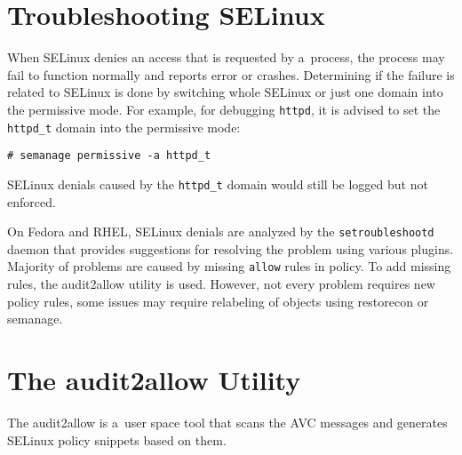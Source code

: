 \section{Troubleshooting SELinux}

When SELinux denies an access that is requested by a~process, the process may
fail to function normally and reports error or crashes. Determining if the
failure is related to SELinux is done by switching whole SELinux or just one
domain into the permissive mode. For example, for debugging \texttt{httpd}, it
is advised to set the \texttt{httpd\_t} domain into the permissive mode:
\begin{lstlisting}
# semanage permissive -a httpd_t
\end{lstlisting}
SELinux denials caused by the \texttt{httpd\_t} domain would still be logged but
not enforced.

On Fedora and RHEL, SELinux denials are analyzed by the \texttt{setroubleshootd}
daemon that provides suggestions for resolving the problem using various
plugins. Majority of problems are caused by missing \texttt{allow} rules in
policy. To add missing rules, the audit2allow utility is used. However, not
every problem requires new policy rules, some issues may require relabeling of
objects using restorecon or semanage.

\section{The audit2allow Utility}
\label{audit2allow}
The audit2allow is a~user space tool that scans the AVC messages and generates
SELinux policy snippets based on them.

